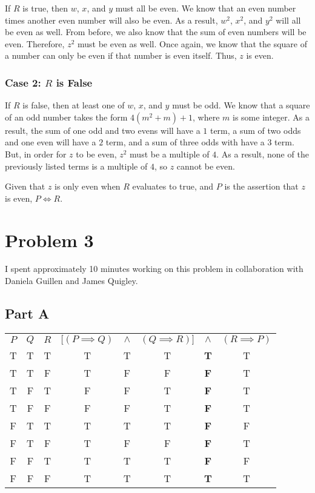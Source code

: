 \documentclass{article}
\begin{document}
If $R$ is true, then $w$, $x$, and $y$ must all be even. We know that an even
number times another even number will also be even. As a result, $w^{2}$,
$x^{2}$, and $y^{2}$ will all be even as well. From before, we also know that
the sum of even numbers will be even. Therefore, $z^{2}$ must be even as well.
Once again, we know that the square of a number can only be even if that number
is even itself. Thus, $z$ is even.

\subsubsection*{Case 2: $R$ is False}

If $R$ is false, then at least one of $w$, $x$, and $y$ must be odd. We know
that a square of an odd number takes the form $4(m^{2} + m) + 1$, where $m$ is
some integer. As a result, the sum of one odd and two evens will have a $1$
term, a sum of two odds and one even will have a $2$ term, and a sum of three
odds with have a $3$ term. But, in order for $z$ to be even, $z^{2}$ must be a
multiple of $4$. As a result, none of the previously listed terms is a multiple
of $4$, so $z$ cannot be even.

\bigbreak

Given that $z$ is only even when $R$ evaluates to true, and $P$ is the assertion
that $z$ is even, $P \iff R$.

\section*{Problem 3}

I spent approximately 10 minutes working on this problem in collaboration with
Daniela Guillen and James Quigley.

\subsection*{Part A}

\begin{center}
  \begin{tabular}{ c c c c c c c c }
    $P$ & $Q$ & $R$ & $[(P \implies Q)$ & $\land$ & $(Q \implies R)]$ & $\land$ &
    $(R \implies P)$ \\
    T & T & T & T & T & T & \textbf{T} & T \\
    T & T & F & T & F & F & \textbf{F} & T \\
    T & F & T & F & F & T & \textbf{F} & T \\
    T & F & F & F & F & T & \textbf{F} & T \\
    F & T & T & T & T & T & \textbf{F} & F \\
    F & T & F & T & F & F & \textbf{F} & T \\
    F & F & T & T & T & T & \textbf{F} & F \\
    F & F & F & T & T & T & \textbf{T} & T \\
  \end{tabular}
\end{center}
\end{document}
